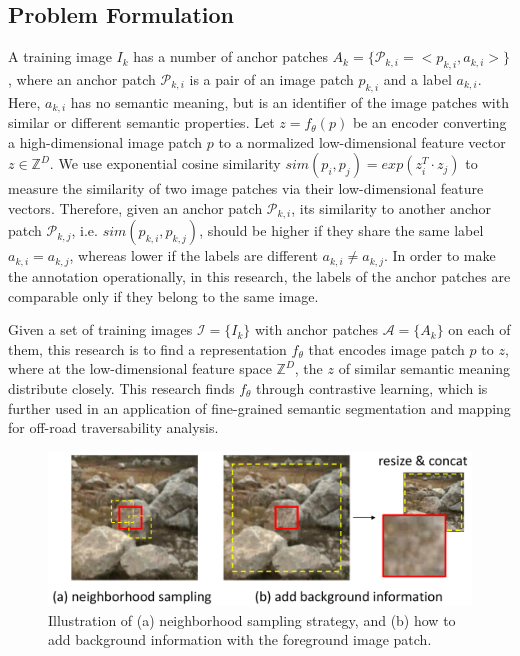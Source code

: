 \documentclass[letterpaper, 10 pt, conference]{ieeeconf}  %
\begin{document}
	\subsection{Problem Formulation}
	
	A training image $I_k$ has a number of anchor patches $A_k=\{\mathcal{P}_{k,i}=<p_{k,i},a_{k,i}>\}$, where an anchor patch $\mathcal{P}_{k,i}$ is a pair of an image patch $p_{k,i}$ and a label $a_{k,i}$. Here, $a_{k,i}$ has no semantic meaning, but is an identifier of the image patches with similar or different semantic properties.
	Let $z=f_{\theta}(p)$ be an encoder converting a high-dimensional image patch $p$ to a normalized low-dimensional feature vector $z\in \mathbb{Z}^D$. 
	We use exponential cosine similarity $sim(p_i,p_j)=exp(z_i^T \cdot z_j)$ to measure the similarity of two image patches via their low-dimensional feature vectors.
	Therefore, given an anchor patch $\mathcal{P}_{k,i}$, its similarity to another anchor patch $\mathcal{P}_{k,j}$, i.e. $sim(p_{k,i},p_{k,j})$, should be higher if they share the same label $a_{k,i}=a_{k,j}$, whereas lower if the labels are different $a_{k,i} \neq a_{k,j}$.
	In order to make the annotation operationally, in this research, the labels of the anchor patches are comparable only if they belong to the same image.
	
	Given a set of training images $\mathcal{I}=\{I_k\}$ with anchor patches $\mathcal{A}=\{A_k\}$ on each of them, this research is to find a representation $f_{\theta}$ that encodes image patch $p$ to $z$, where at the low-dimensional feature space $\mathbb{Z}^D$, the $z$ of similar semantic meaning distribute closely. 
	This research finds $f_{\theta}$ through contrastive learning, which is further used in an application of fine-grained semantic segmentation and mapping for off-road traversability analysis.
	
	\begin{figure}[]
		\centering
		\includegraphics[scale=0.20]{dataaug.pdf}
		\caption{Illustration of (a) neighborhood sampling strategy, and (b) how to add background information with the foreground image patch.}
		\label{fig:dataaug}
	\end{figure}
	
\end{document}
